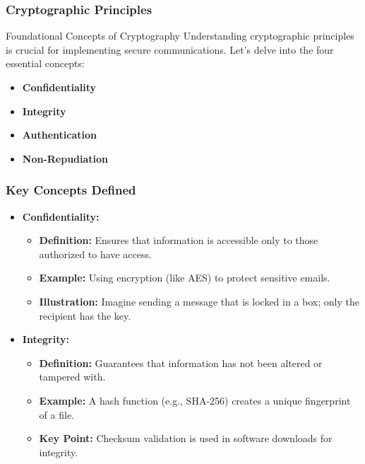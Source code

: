 \documentclass{beamer}
\begin{document}
\begin{frame}
    \frametitle{Cryptographic Principles}
    \begin{block}{Foundational Concepts of Cryptography}
        Understanding cryptographic principles is crucial for implementing secure communications. 
        Let's delve into the four essential concepts: 
        \begin{itemize}
            \item \textbf{Confidentiality}
            \item \textbf{Integrity}
            \item \textbf{Authentication}
            \item \textbf{Non-Repudiation}
        \end{itemize}
    \end{block}
\end{frame}

\begin{frame}
    \frametitle{Key Concepts Defined}
    \begin{itemize}
        \item \textbf{Confidentiality:}
            \begin{itemize}
                \item \textbf{Definition:} Ensures that information is accessible only to those authorized to have access.
                \item \textbf{Example:} Using encryption (like AES) to protect sensitive emails.
                \item \textbf{Illustration:} Imagine sending a message that is locked in a box; only the recipient has the key.
            \end{itemize}
        
        \item \textbf{Integrity:}
            \begin{itemize}
                \item \textbf{Definition:} Guarantees that information has not been altered or tampered with.
                \item \textbf{Example:} A hash function (e.g., SHA-256) creates a unique fingerprint of a file.
                \item \textbf{Key Point:} Checksum validation is used in software downloads for integrity.
            \end{itemize}
    \end{itemize}
\end{frame}
\end{document}
